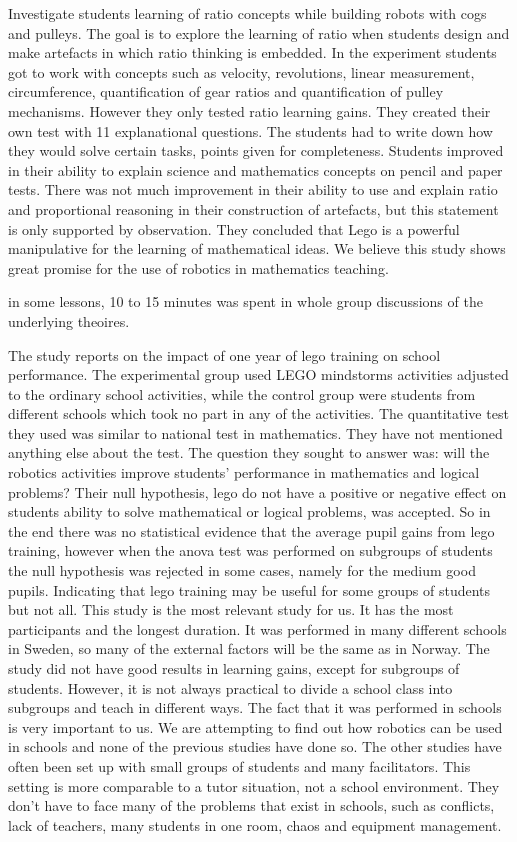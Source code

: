 \bigskip\noindent
\cite{norton2004using} Investigate students learning of ratio concepts while building robots with cogs and pulleys. The goal is to explore the learning of ratio when students design and make artefacts in which ratio thinking is embedded. In the experiment students got to work with concepts such as velocity, revolutions, linear measurement, circumference, quantification of gear ratios and quantification of pulley mechanisms. However they only tested ratio learning gains. They created their own test with 11 explanational questions. The students had to write down how they would solve certain tasks, points given for completeness. Students improved in their ability to explain science and mathematics concepts on pencil and paper tests. There was not much improvement in their ability to use and explain ratio and proportional reasoning in their construction of artefacts, but this statement is only supported by observation. They concluded that Lego is a powerful manipulative for the  learning of mathematical ideas. We believe this study shows great promise for the use of robotics in mathematics teaching.

\bigskip\noindent
\cite{norton2004using}in some lessons, 10 to 15 minutes was spent in whole group discussions of the underlying theoires. 

\bigskip\noindent
\cite{lindh2007does} The study reports on the impact of one year of lego training on school performance. The experimental group used LEGO mindstorms activities adjusted to the ordinary school activities, while the control group were students from different schools which took no part in any of the activities. The quantitative test they used was similar to national test in mathematics. They have not mentioned anything else about the test. The question they sought to answer was: will the robotics activities improve students' performance in mathematics and logical problems? Their null hypothesis, lego do not have a positive or negative effect on students ability to solve mathematical or logical problems, was accepted. So in the end there was no statistical evidence that the average pupil gains from lego training, however when the anova test was performed on subgroups of students the null hypothesis was rejected in some cases, namely for the medium good pupils. Indicating that lego training may be useful for some groups of students but not all. This study is the most relevant study for us. It has the most participants and the longest duration. It was performed in many different schools in Sweden, so many of the external factors will be the same as in Norway. The study did not have good results in learning gains, except for subgroups of students. However, it is not always practical to divide a school class into subgroups and teach in different ways. The fact that it was performed in schools is very important to us. We are attempting to find out how robotics can be used in schools and none of the previous studies have done so. The other studies have often been set up with small groups of students and many facilitators. This setting is more comparable to a tutor situation, not a school environment. They don't have to face many of the problems that exist in schools, such as conflicts, lack of teachers, many students in one room, chaos and equipment management. 

